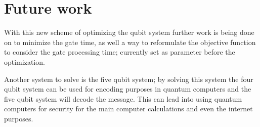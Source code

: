 \section{Future work}

With this new scheme of optimizing the qubit system further work is being done on to minimize the gate time, as well a way to reformulate the objective function to consider the gate processing time; currently set as parameter before the optimization. 

Another system to solve is the five qubit system; by solving this system the four qubit system can be used for encoding purposes in quantum computers and the five qubit system will decode the message. This can lead into using quantum computers for security for the main computer calculations and even the internet purposes. 


